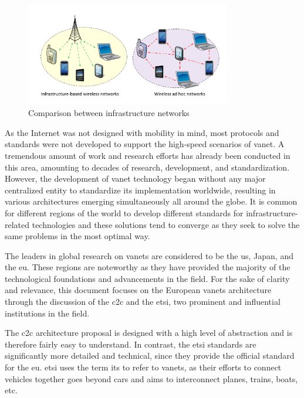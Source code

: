 \begin{figure}[htbp]
	\centering
	\includegraphics[width=0.8\textwidth]{Chapters/Figures/VANETs/ad_hoc_networks.png}
	\caption{Comparison between infrastructure networks~\cite{dinh_thai_applications_2015}}
	\label{fig:ad_hoc}
\end{figure}


As the Internet was not designed with mobility in mind, most protocols and standards were not developed to support the high-speed scenarios of \gls{vanet}. A tremendous amount of work and research efforts has already been conducted in this area, amounting to decades of research, development, and standardization. However, the development of \gls{vanet} technology began without any major centralized entity to standardize its implementation worldwide, resulting in various architectures emerging simultaneously all around the globe. It is common for different regions of the world to develop different standards for infrastructure-related technologies and these solutions tend to converge as they seek to solve the same problems in the most optimal way. 

The leaders in global research on \glspl{vanet} are considered to be the \gls{us}, Japan, and the \gls{eu}. These regions are noteworthy as they have provided the majority of the technological foundations and advancements in the field. For the sake of clarity and relevance, this document focuses on the European \glspl{vanet} architecture through the discussion of the \gls{c2c} and the \gls{etsi}, two prominent and influential institutions in the field. 

The \gls{c2c} architecture proposal is designed with a high level of abstraction and is therefore fairly easy to understand. In contrast, the \gls{etsi} standards are significantly more detailed and technical, since they provide the official standard for the \gls{eu}. \gls{etsi} uses the term \gls{its} to refer to \glspl{vanet}, as their efforts to connect vehicles together goes beyond cars and aims to interconnect planes, trains, boats, etc.

